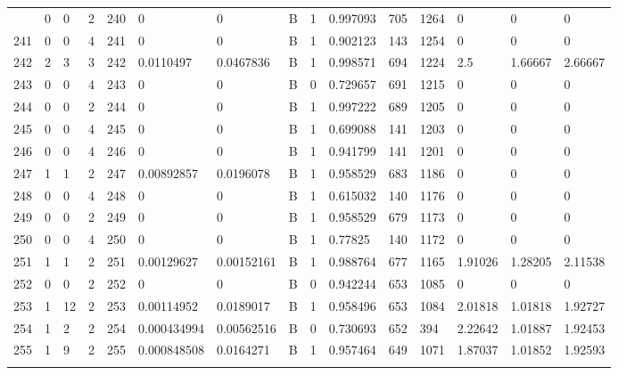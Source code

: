\begin{latin}
\begin{longtable}{lllllllllllllll}
\begin{comment}
	240 & 0  & 0   & 2  & 240 & 0              & 0              & B & 1  & 0.997093 & 705  & 1264 & 0       & 0       & 0       \\
	241 & 0  & 0   & 4  & 241 & 0              & 0              & B & 1  & 0.902123 & 143  & 1254 & 0       & 0       & 0       \\
	242 & 2  & 3   & 3  & 242 & 0.0110497      & 0.0467836      & B & 1  & 0.998571 & 694  & 1224 & 2.5     & 1.66667 & 2.66667 \\
	243 & 0  & 0   & 4  & 243 & 0              & 0              & B & 0  & 0.729657 & 691  & 1215 & 0       & 0       & 0       \\
	244 & 0  & 0   & 2  & 244 & 0              & 0              & B & 1  & 0.997222 & 689  & 1205 & 0       & 0       & 0       \\
	245 & 0  & 0   & 4  & 245 & 0              & 0              & B & 1  & 0.699088 & 141  & 1203 & 0       & 0       & 0       \\
	246 & 0  & 0   & 4  & 246 & 0              & 0              & B & 1  & 0.941799 & 141  & 1201 & 0       & 0       & 0       \\
	247 & 1  & 1   & 2  & 247 & 0.00892857     & 0.0196078      & B & 1  & 0.958529 & 683  & 1186 & 0       & 0       & 0       \\
	248 & 0  & 0   & 4  & 248 & 0              & 0              & B & 1  & 0.615032 & 140  & 1176 & 0       & 0       & 0       \\
	249 & 0  & 0   & 2  & 249 & 0              & 0              & B & 1  & 0.958529 & 679  & 1173 & 0       & 0       & 0       \\
	250 & 0  & 0   & 4  & 250 & 0              & 0              & B & 1  & 0.77825  & 140  & 1172 & 0       & 0       & 0       \\
	251 & 1  & 1   & 2  & 251 & 0.00129627     & 0.00152161     & B & 1  & 0.988764 & 677  & 1165 & 1.91026 & 1.28205 & 2.11538 \\
	252 & 0  & 0   & 2  & 252 & 0              & 0              & B & 0  & 0.942244 & 653  & 1085 & 0       & 0       & 0       \\
	253 & 1  & 12  & 2  & 253 & 0.00114952     & 0.0189017      & B & 1  & 0.958496 & 653  & 1084 & 2.01818 & 1.01818 & 1.92727 \\
	254 & 1  & 2   & 2  & 254 & 0.000434994    & 0.00562516     & B & 0  & 0.730693 & 652  & 394  & 2.22642 & 1.01887 & 1.92453 \\
	255 & 1  & 9   & 2  & 255 & 0.000848508    & 0.0164271      & B & 1  & 0.957464 & 649  & 1071 & 1.87037 & 1.01852 & 1.92593 \\

\end{comment}
\end{longtable}
\end{latin}
